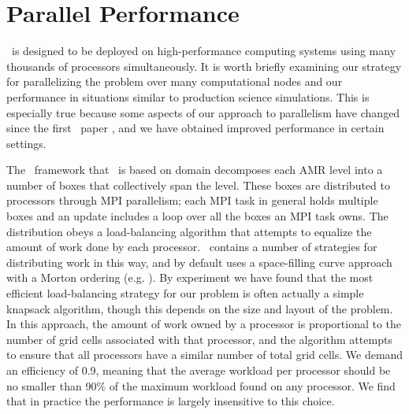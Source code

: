\documentclass[12pt]{article}
\begin{document}
\clearpage
\section{Parallel Performance}
\label{sec:performance}

\castro\ is designed to be deployed on high-performance computing systems using 
many thousands of processors simultaneously. It is worth briefly examining 
our strategy for parallelizing the problem over many computational nodes 
and our performance in situations similar to production science simulations. 
This is especially true because some aspects of our approach to parallelism 
have changed since the first \castro\ paper \citep{castro}, and we have obtained improved 
performance in certain settings.

The \boxlib\ framework that \castro\ is based on domain decomposes each AMR level into a number 
of boxes that collectively span the level. These boxes are distributed to processors 
through MPI parallelism; each MPI task in general holds multiple boxes and 
an update includes a loop over all the boxes an MPI task owns. The distribution 
obeys a load-balancing algorithm that attempts to equalize the amount of work 
done by each processor. \boxlib\ contains a number of strategies for distributing 
work in this way, and by default uses a space-filling curve approach with a 
Morton ordering (e.g. \cite{sasidharan:2015,beichl:1998}). By experiment we have
found that the most efficient load-balancing strategy for our problem is often
actually a simple knapsack algorithm, though this depends on the size and layout of
the problem. In this approach, 
the amount of work owned by a processor is proportional to the number of grid cells 
associated with that processor, and the algorithm attempts to ensure that all 
processors have a similar number of total grid cells. We demand an efficiency of 0.9,
meaning that the average workload per processor should be no smaller than 90\% of the 
maximum workload found on any processor. We find that in practice the 
performance is largely insensitive to this choice.
\end{document}

